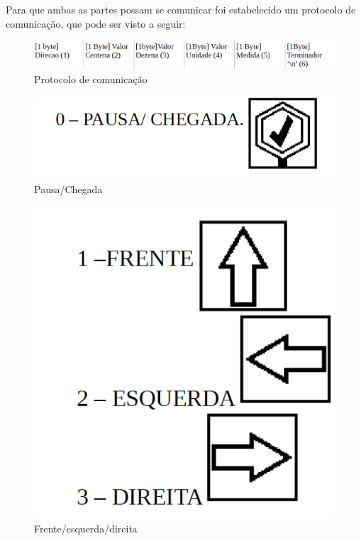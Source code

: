 	Para que ambas as partes possam se comunicar foi estabelecido um protocolo de comunicação, que pode ser visto a seguir:
	
	\begin{figure}[h!]
		\centering
		\includegraphics[scale=0.60]{protocolo1.png}
		\caption{Protocolo de comunicação}
		\label{img:Protocolo}
	\end{figure}
	
	\begin{figure}[h!]
		\centering
		\includegraphics[scale=0.60]{chegada.png}
		\caption{Pausa/Chegada}
		\label{img:Chegada}
	\end{figure}
	
	\begin{figure}[h!]
		\centering
		\includegraphics[scale=0.60]{fed.png}
		\caption{Frente/esquerda/direita}
		\label{img:fed}
	\end{figure}
	

